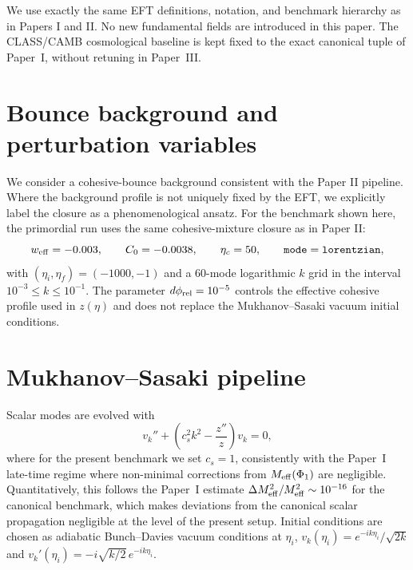 \documentclass[aps,prd,onecolumn,nofootinbib,superscriptaddress]{revtex4-2}
\newcommand{\Meff}{M_{\rm eff}}
\begin{document}
We use exactly the same EFT definitions, notation, and benchmark hierarchy as in Papers I and II.
No new fundamental fields are introduced in this paper.
The CLASS/CAMB cosmological baseline is kept fixed to the exact canonical tuple of Paper~I,
without retuning in Paper~III.

\section{Bounce background and perturbation variables}
\label{sec:background}

We consider a cohesive-bounce background consistent with the Paper II pipeline.
Where the background profile is not uniquely fixed by the EFT, we explicitly label the closure as a phenomenological ansatz.
For the benchmark shown here, the primordial run uses the same cohesive-mixture closure as in Paper II:
\begin{equation}
w_{\rm eff}=-0.003,\qquad C_0=-0.0038,\qquad \eta_c=50,\qquad \texttt{mode}=\texttt{lorentzian},
\end{equation}
with $(\eta_i,\eta_f)=(-1000,-1)$ and a 60-mode logarithmic $k$ grid in the interval
$10^{-3}\leq k\leq 10^{-1}$.
The parameter $d\phi_{\rm rel}=10^{-5}$ controls the effective cohesive profile used in $z(\eta)$ and does not replace the Mukhanov--Sasaki vacuum initial conditions.

\section{Mukhanov--Sasaki pipeline}
\label{sec:ms}

Scalar modes are evolved with
\begin{equation}
v_k'' + \left(c_s^2 k^2 - \frac{z''}{z}\right) v_k = 0,
\end{equation}
where for the present benchmark we set $c_s=1$, consistently with the Paper~I late-time regime where non-minimal corrections from $\Meff(\Phi_1)$ are negligible.
Quantitatively, this follows the Paper~I estimate $\Delta \Meff^2/\Meff^2\sim10^{-16}$ for the canonical benchmark, which makes deviations from the canonical scalar propagation negligible at the level of the present setup.
Initial conditions are chosen as adiabatic Bunch--Davies vacuum conditions at $\eta_i$,
$v_k(\eta_i)=e^{-ik\eta_i}/\sqrt{2k}$ and
$v_k'(\eta_i)=-i\sqrt{k/2}\,e^{-ik\eta_i}$.
\end{document}
